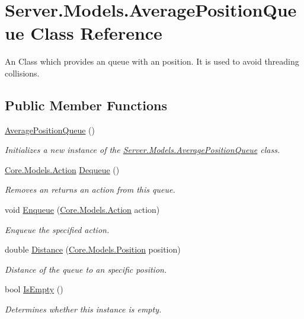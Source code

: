 \hypertarget{classServer_1_1Models_1_1AveragePositionQueue}{}\section{Server.\+Models.\+Average\+Position\+Queue Class Reference}
\label{classServer_1_1Models_1_1AveragePositionQueue}


An Class which provides an queue with an position. It is used to avoid threading collisions.  


\subsection*{Public Member Functions}
\begin{DoxyCompactItemize}
\item 
\hyperlink{classServer_1_1Models_1_1AveragePositionQueue_a3da2fb989695de4a682ac673d302e0eb}{Average\+Position\+Queue} ()
\begin{DoxyCompactList}\small\item\em Initializes a new instance of the \hyperlink{classServer_1_1Models_1_1AveragePositionQueue}{Server.\+Models.\+Average\+Position\+Queue} class. \end{DoxyCompactList}\item 
\hyperlink{classCore_1_1Models_1_1Action}{Core.\+Models.\+Action} \hyperlink{classServer_1_1Models_1_1AveragePositionQueue_af638cb421bbe8c01aa44c315b19c61b0}{Dequeue} ()
\begin{DoxyCompactList}\small\item\em Removes an returns an action from this queue. \end{DoxyCompactList}\item 
void \hyperlink{classServer_1_1Models_1_1AveragePositionQueue_a097132f9d12413dbf63e96eb8b7a3668}{Enqueue} (\hyperlink{classCore_1_1Models_1_1Action}{Core.\+Models.\+Action} action)
\begin{DoxyCompactList}\small\item\em Enqueue the specified action. \end{DoxyCompactList}\item 
double \hyperlink{classServer_1_1Models_1_1AveragePositionQueue_ab55c450d518c4956bfefc7516358ab9b}{Distance} (\hyperlink{classCore_1_1Models_1_1Position}{Core.\+Models.\+Position} position)
\begin{DoxyCompactList}\small\item\em Distance of the queue to an specific position. \end{DoxyCompactList}\item 
bool \hyperlink{classServer_1_1Models_1_1AveragePositionQueue_a5b234de54c4b44e317abfc29f1453a34}{Is\+Empty} ()
\begin{DoxyCompactList}\small\item\em Determines whether this instance is empty. \end{DoxyCompactList}\end{DoxyCompactItemize}


